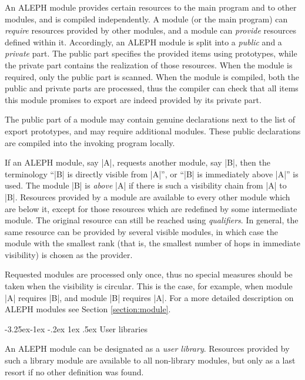 \documentclass[titlepage]{article}
\makeatletter
\newcommand\A{\textsf{ALEPH}}
\renewcommand\subsection{%
\@startsection{subsection}{2}{\z@}%
   {-3.25ex\@plus -1ex \@minus -.2ex}%
   {1ex \@plus .5ex}%
   {\normalfont\normalsize\bfseries}}
\makeatother
\begin{document}
An \A{} module provides certain resources to the main program and to other
modules, and is compiled independently. A module (or the main program)
can \emph{require} resources provided by other modules, and a module can
\emph{provide} resources defined within it. Accordingly, an \A{} module is
split into a \emph{public} and a \emph{private} part. The public part
specifies the provided items using prototypes, while the private part
contains the realization of those resources. When the module is required,
only the public part is scanned. When the module is compiled, both the
public and private parts are processed, thus the compiler can check that all
items this module promises to export are indeed provided by its private
part.

The public part of a module may contain genuine declarations next to the
list of export prototypes, and may require additional modules. These public
declarations are compiled into the invoking program locally.

If an \A{} module, say \pp|A|, requests another module, say \pp|B|,
then the terminology ``\pp|B| is directly visible from \pp|A|'', or
``\pp|B| is immediately above \pp|A|'' is used. The module \pp|B|
is \emph{above} \pp|A| if there is such a visibility chain from \pp|A|
to \pp|B|. Resources provided by a module are available to every other
module which are below it, except for those resources which are redefined by
some intermediate module. The original resource can still be reached using
\emph{qualifiers}. In general, the same resource can be provided by several
visible modules, in which case the module with the smallest rank (that is,
the smallest number of hops in immediate visibility) is chosen as the
provider.

Requested modules are processed only once, thus no special measures should be
taken when the visibility is circular. This is the case, for example, when
module \pp|A| requires \pp|B|, and module \pp|B| requires
\pp|A|. For a more detailed description on \A{} modules see Section
\ref{section:module}.
 
\subsection{User libraries}\label{subsec:user-library}

An \A{} module can be designated as a \emph{user library}. Resources
provided by such a library module are available to all non-library modules,
but only as a last resort if no other definition was found.
\end{document}
